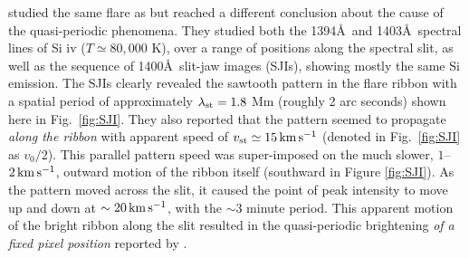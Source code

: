 \citet[][hereafter called \BLQ]{Brannon2015} studied the same flare as \citet{Brosius2015} but reached a different conclusion about the cause of the quasi-periodic phenomena.  They studied both the 1394\AA\ and 1403\AA\ spectral lines of Si {\sc iv} ($T\simeq80,000$ K), over a range of positions along the spectral slit, as well as the sequence of 1400\AA\ slit-jaw images (SJIs), showing mostly the same Si emission.  The SJIs clearly revealed the sawtooth pattern in the flare ribbon with a spatial period of approximately $\lambda_{\rm st}=1.8$ Mm (roughly 2 arc seconds) shown here in Fig.\ \ref{fig:SJI}.  They also reported that the pattern seemed to propagate {\em along the ribbon} with apparent speed of $v_{\rm st}\simeq 15\,{\rm km\, s^{-1}}$ (denoted in Fig.\ \ref{fig:SJI} as $v_0/2$).  This parallel pattern speed was super-imposed on the much slower, $1$--$2\,{\rm km\, s^{-1}}$, outward motion of the ribbon itself (southward in Figure \ref{fig:SJI}).  As the pattern moved across the slit, it caused the point of peak intensity to move up and down at $\sim20\,{\rm km\, s^{-1}}$, with the $\sim 3$ minute period.   This apparent motion of the bright ribbon along the slit resulted in the quasi-periodic brightening {\em of a fixed \textit{pixel} position} reported by \citet{Brosius2015}.



